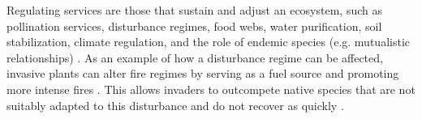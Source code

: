 Regulating services are those that sustain and adjust an ecosystem, such as pollination services, disturbance regimes, food webs, water purification, soil stabilization, climate regulation, and the role of endemic species (e.g. mutualistic relationships) \citep{Pejchar2009, Vila2017}. As an example of how a disturbance regime can be affected, invasive plants can alter fire regimes by serving as a fuel source and promoting more intense fires \citep{DAntonio1992, Brooks2004,Milton2004,LeMaitre2014}. This allows invaders to outcompete native species that are not suitably adapted to this disturbance and do not recover as quickly \citep{Milton2004}. \\
